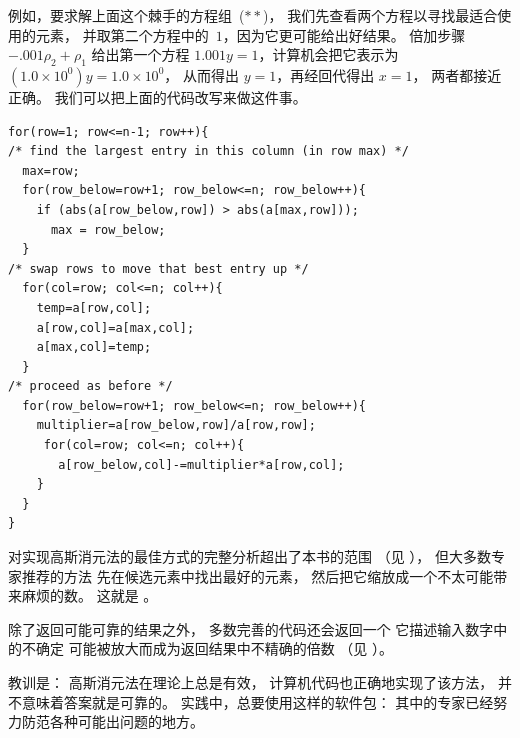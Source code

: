 例如，要求解上面这个棘手的方程组~($**$)，
我们先查看两个方程以寻找最适合使用的元素，
并取第二个方程中的~$1$，因为它更可能给出好结果。
倍加步骤 $-.001\rho_2+\rho_1$ 给出第一个方程
$1.001y=1$，计算机会把它表示为
$(1.0\times 10^{0})y=1.0\times 10^{0}$，
从而得出 $y=1$，再经回代得出 $x=1$，
两者都接近正确。
我们可以把上面的代码改写来做这件事。
\begin{lstlisting}
for(row=1; row<=n-1; row++){
/* find the largest entry in this column (in row max) */
  max=row;
  for(row_below=row+1; row_below<=n; row_below++){
    if (abs(a[row_below,row]) > abs(a[max,row]));
      max = row_below;
  }
/* swap rows to move that best entry up */
  for(col=row; col<=n; col++){
    temp=a[row,col];
    a[row,col]=a[max,col];
    a[max,col]=temp;
  }
/* proceed as before */
  for(row_below=row+1; row_below<=n; row_below++){
    multiplier=a[row_below,row]/a[row,row];
     for(col=row; col<=n; col++){
       a[row_below,col]-=multiplier*a[row,col];
    }
  }
}
\end{lstlisting}

对实现高斯消元法的最佳方式的完整分析超出了本书的范围
（见 \cite{Wilkinson65}），
但大多数专家推荐的方法
先在候选元素中找出最好的元素，
然后把它缩放成一个不太可能带来麻烦的数。
这就是
。

除了返回可能可靠的结果之外，
多数完善的代码还会返回一个
%
它描述输入数字中的不确定
可能被放大而成为返回结果中不精确的倍数
（见 \cite{Rice}）。

教训是：
高斯消元法在理论上总是有效，
计算机代码也正确地实现了该方法，
并不意味着答案就是可靠的。
实践中，总要使用这样的软件包：
其中的专家已经努力防范各种可能出问题的地方。

